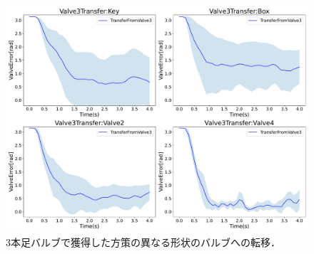 \documentclass[dvipdfmx]{ampbt_nomag}
\begin{document}
\begin{figure}[htbp]
  \centering
  \includegraphics[width=16cm]
       {asset/img/SimTurn180OtherTransfer.pdf}
  \caption{3本足バルブで獲得した方策の異なる形状のバルブへの転移．}
  \label{Transfer_in_Sim}
\end{figure}
\end{document}
